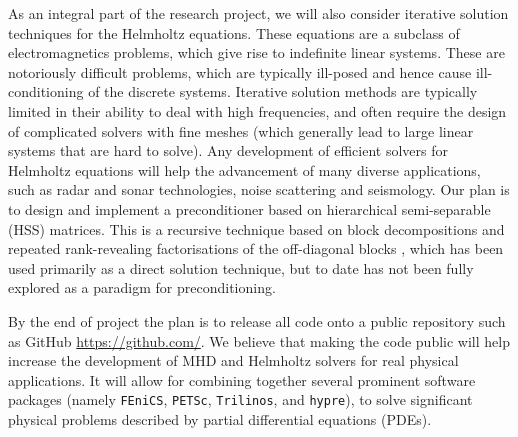 \documentclass[12pt]{article}
\numberwithin{equation}{section}    %
\begin{document}
As an integral part of the research project, we will also consider iterative solution techniques for the Helmholtz equations. These equations are a subclass of electromagnetics problems, which give rise to indefinite linear systems. These are notoriously difficult problems, which are typically ill-posed and hence cause ill-conditioning of the discrete systems. Iterative solution methods are typically limited in their ability to deal with high frequencies, and often require the design of complicated solvers with fine meshes (which generally lead to large linear systems that are hard to solve). Any development of efficient solvers for Helmholtz equations will help the advancement of many diverse applications, such as radar and sonar technologies, noise scattering and seismology. Our plan is to design and implement a preconditioner based on hierarchical semi-separable (HSS) matrices. This is a recursive technique based on block decompositions and repeated rank-revealing factorisations of the off-diagonal blocks \cite{wang2011efficient}, which has been used primarily as a direct solution technique, but to date has not been fully explored as a paradigm for preconditioning.

\smallskip

By the end of project the plan is to release all code onto a public repository such as GitHub \url{https://github.com/}. We believe that making the code public will help increase the development of MHD and Helmholtz solvers for real physical applications. It will allow for combining together several prominent software packages (namely {\tt FEniCS}, {\tt PETSc}, {\tt Trilinos}, and {\tt hypre}), to solve significant physical problems described by partial differential equations (PDEs).



\renewcommand{\section}[2]{}


\newpage


\bigskip
\end{document}
